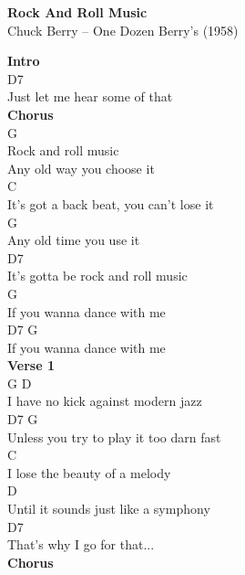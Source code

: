 \documentclass[a4paper]{article}
\begin{document}
    \begin{center}
        \textbf{Rock And Roll Music}
        ~\\
        Chuck Berry -- One Dozen Berry's (1958)
    \end{center}
    {
        \scriptsize
        \textbf{Intro}
        ~\\
        {
            \cutive
            \obeyspaces
D7
\\
Just let me hear some of that
\\

        }
        \textbf{Chorus}
        ~\\
        {
            \cutive
            \obeyspaces
G
\\
Rock and roll music 
\\
Any old way you choose it
\\
           C           
\\
It's got a back beat, you can't lose it
\\
G
\\
Any old time you use it
\\
     D7
\\
It's gotta be rock and roll music
\\
                        G
\\
If you wanna dance with me
\\
D7                      G
\\
If you wanna dance with me
\\

        }
        \textbf{Verse 1}
        ~\\
        {
            \cutive
            \obeyspaces
G                      D
\\
I have no kick against modern jazz
\\
D7                          G
\\
  Unless you try to play it too darn fast
\\
                       C
\\
I lose the beauty of a melody
\\
                            D
\\
Until it sounds just like a symphony
\\
D7
\\
That's why I go for that...
\\

        }
        \textbf{Chorus}
        ~\\
        {
            \cutive
            \obeyspaces

}}
\end{document}

